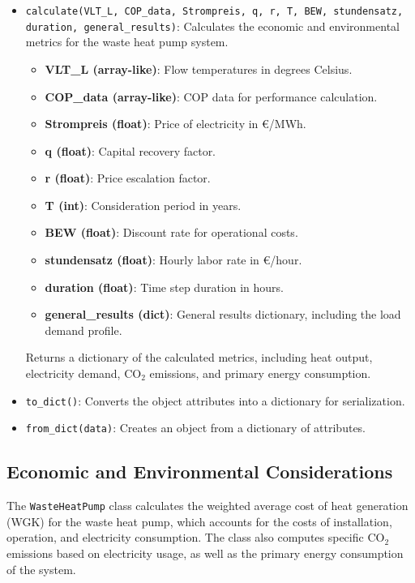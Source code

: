 \begin{itemize}
    \item \texttt{calculate(VLT\_L, COP\_data, Strompreis, q, r, T, BEW, stundensatz, duration, general\_results)}: 
    Calculates the economic and environmental metrics for the waste heat pump system.
    \begin{itemize}
        \item \textbf{VLT\_L (array-like)}: Flow temperatures in degrees Celsius.
        \item \textbf{COP\_data (array-like)}: COP data for performance calculation.
        \item \textbf{Strompreis (float)}: Price of electricity in €/MWh.
        \item \textbf{q (float)}: Capital recovery factor.
        \item \textbf{r (float)}: Price escalation factor.
        \item \textbf{T (int)}: Consideration period in years.
        \item \textbf{BEW (float)}: Discount rate for operational costs.
        \item \textbf{stundensatz (float)}: Hourly labor rate in €/hour.
        \item \textbf{duration (float)}: Time step duration in hours.
        \item \textbf{general\_results (dict)}: General results dictionary, including the load demand profile.
    \end{itemize}
    Returns a dictionary of the calculated metrics, including heat output, electricity demand, CO$_2$ emissions, and primary energy consumption.

    \item \texttt{to\_dict()}: Converts the object attributes into a dictionary for serialization.
    
    \item \texttt{from\_dict(data)}: Creates an object from a dictionary of attributes.
\end{itemize}

\subsection{Economic and Environmental Considerations}
The \texttt{WasteHeatPump} class calculates the weighted average cost of heat generation (WGK) for the waste heat pump, which accounts for the costs of installation, operation, and electricity consumption. The class also computes specific CO$_2$ emissions based on electricity usage, as well as the primary energy consumption of the system.

